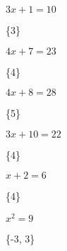 \documentclass[10pt]{examdesign}
\begin{document}
\begin{shortanswer}[title={Short Answer (1 point each)}, rearrange=no,resetcounter=no,suppressprefix]
    
\begin{question}
	$3 x + 1 = 10$
	\vspace{1cm}
	\begin{answer}
		\{{3}\}
	\end{answer}
\end{question}
\begin{question}
	$4 x + 7 = 23$
	\vspace{1cm}
	\begin{answer}
		\{{4}\}
	\end{answer}
\end{question}
\begin{question}
	$4 x + 8 = 28$
	\vspace{1cm}
	\begin{answer}
		\{{5}\}
	\end{answer}
\end{question}
\begin{question}
	$3 x + 10 = 22$
	\vspace{1cm}
	\begin{answer}
		\{{4}\}
	\end{answer}
\end{question}
\begin{question}
	$x + 2 = 6$
	\vspace{1cm}
	\begin{answer}
		\{{4}\}
	\end{answer}
\end{question}
\begin{question}
	$x^{2} = 9$
	\vspace{1cm}
	\begin{answer}
		\{{-3, 3}\}
	\end{answer}
\end{question}
\end{shortanswer}
\end{document}
